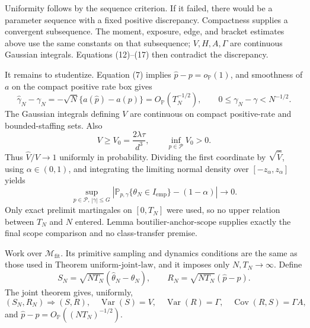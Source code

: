 Uniformity follows by the sequence criterion.  If it failed, there would be a parameter sequence with a fixed positive discrepancy.  Compactness supplies a convergent subsequence.  The moment, exposure, edge, and bracket estimates above use the same constants on that subsequence; \(V,H,A,\Gamma\) are continuous Gaussian integrals.  Equations (12)--(17) then contradict the discrepancy.

It remains to studentize.  Equation (7) implies \(\widehat p-p=o_{\mathbb P}(1)\), and smoothness of \(a\) on the compact positive rate box gives
\[
 \widehat\gamma_N-\gamma_N
 =-\sqrt N\{a(\widehat p)-a(p)\}=O_{\mathbb P}(T_N^{-1/2}),
 \qquad 0\leq\gamma_N-\gamma<N^{-1/2}.                       \tag{18}
\]
The Gaussian integrals defining \(V\) are continuous on compact positive-rate and bounded-staffing sets.  Also
\[
 V\geq V_0=\frac{2\lambda\tau}{d^3},
 \qquad \inf_{p\in\mathcal P}V_0>0.                          \tag{19}
\]
Thus \(\widehat V/V\to1\) uniformly in probability.  Dividing the first coordinate by \(\sqrt{\widehat V}\), using \(\alpha\in(0,1)\), and integrating the limiting normal density over \([-z_\alpha,z_\alpha]\) yields
\[
 \sup_{p\in\mathcal P,\,|\gamma|\leq G}
 \left|\mathbb P_{p,\gamma}\{\theta_N\in I_{\mathrm{emp}}\}-(1-\alpha)\right|
 \longrightarrow0.                                           \tag{20}
\]
Only exact prelimit martingales on \([0,T_N]\) were used, so no upper relation between \(T_N\) and \(N\) entered.  Lemma \(\mathrm{boutilier\mbox{-}anchor\mbox{-}scope}\) supplies exactly the final scope comparison and no class-transfer premise.

Work over \(\mathcal M_{\mathrm{fit}}\).  Its primitive sampling and dynamics conditions are the same as those used in Theorem \(\mathrm{uniform\mbox{-}joint\mbox{-}law}\), and it imposes only \(N,T_N\to\infty\).  Define
\[
 S_N=\sqrt{NT_N}(\widehat\theta_N-\theta_N),
 \qquad R_N=\sqrt{NT_N}(\widehat p-p).
\]
The joint theorem gives, uniformly,
\[
 (S_N,R_N)\Rightarrow(S,R),
 \quad \operatorname{Var}(S)=V,
 \quad \operatorname{Var}(R)=\Gamma,
 \quad \operatorname{Cov}(R,S)=\Gamma A,                      \tag{1}
\]
and \(\widehat p-p=O_{\mathbb P}((NT_N)^{-1/2})\).

